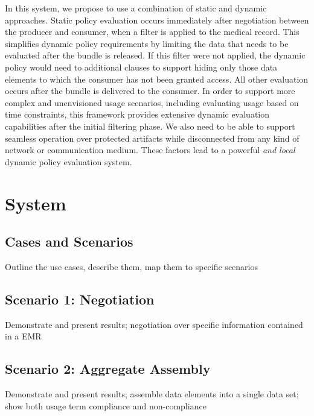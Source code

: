 \documentclass[10pt, conference, compsocconf]{IEEEtran}
\begin{document}
In this system, we propose to use a combination of static and dynamic approaches.  Static policy evaluation occurs immediately after negotiation between the producer and consumer, when a filter is applied to the medical record.  This simplifies dynamic policy requirements by limiting the data that needs to be evaluated after the bundle is released.  If this filter were not applied, the dynamic policy would need to additional clauses to support hiding only those data elements to which the consumer has not been granted access.  All other evaluation occurs after the bundle is delivered to the consumer.  In order to support more complex and unenvisioned usage scenarios, including evaluating usage based on time constraints, this framework provides extensive dynamic evaluation capabilities after the initial filtering phase.  We also need to be able to support seamless operation over protected artifacts while disconnected from any kind of network or communication medium.  These factors lead to a powerful \textit{and local} dynamic policy evaluation system.

\section*{System}

\subsection*{Cases and Scenarios}
Outline the use cases, describe them, map them to specific scenarios

\subsection*{Scenario 1: Negotiation}
Demonstrate and present results; negotiation over specific information contained in a EMR

\subsection*{Scenario 2: Aggregate Assembly}
Demonstrate and present results; assemble data elements into a single data set; show both usage term compliance and non-compliance
\end{document}
